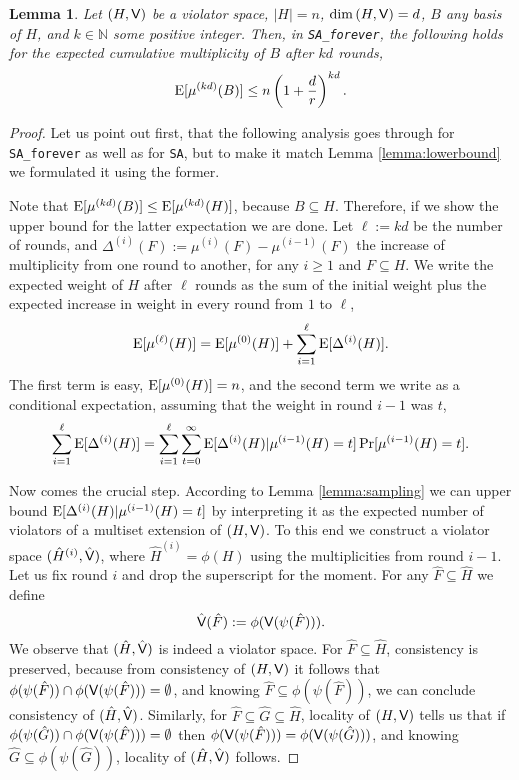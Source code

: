 \documentclass[12pt]{article}
\def\Exp{\qopname\relax m{E}}
\def\Violators{{\sf V}}
\newtheorem{lemma2}[theorem2]{Lemma}
\newenvironment{lemma}{\begin{lemma2}}{\end{lemma2}}
\theoremstyle{remark}
\def\stageII{\texttt{SA}}
\def\stageIIforever{\texttt{SA\_forever}}
\begin{document}
\begin{lemma}
\label{lemma:upperbound}
Let $(H,\Violators)$ be a violator space, $|H|=n$, $\dim{(H,\Violators)}=d$,
$B$ any basis of $H$, and $k \in \mathbb{N}$ some positive integer.
Then, in \stageIIforever, the following holds for the expected cumulative
multiplicity of $B$ after $kd$ rounds,
\[
	\Exp[\mu^{(kd)}(B)] \leq n\left(1+\frac{d}{r}\right)^{kd}.
\]
\end{lemma}
\begin{proof}

Let us point out first, that the following analysis goes through for
\stageIIforever{ }as well
as for \stageII, but to make it match Lemma \ref{lemma:lowerbound} we formulated it using
the former.

Note that $\Exp[\mu^{(kd)}(B)] \leq \Exp[\mu^{(kd)}(H)]$, because $B
\subseteq H$. Therefore, if we show the upper bound for the latter expectation we are done. Let  
$\ell:=k d$ be the number of rounds, and
$\Delta^{(i)}(F) := \mu^{(i)}(F) - \mu^{(i-1)}(F)$ the increase of multiplicity from one round to another, for any $i\geq1$ and
$F\subseteq H$.
We write the expected weight of $H$ after $\ell$ rounds as the sum of the initial 
weight plus the expected increase in weight in every round from $1$ to $\ell$,
\begin{equation}
\label{eq:d01}
	\Exp[\mu^{(\ell)}(H)]  =  \Exp[\mu^{(0)}(H)] + \sum_{i=1}^\ell \Exp[\Delta^{(i)}(H)].
\end{equation}
The first term is easy, $\Exp[\mu^{(0)}(H)]=n$, and the second term we write as a conditional 
expectation,
assuming that the weight in round $i-1$ was $t$,
\begin{equation}
\label{eq:d02}
	\sum_{i=1}^\ell \Exp[\Delta^{(i)}(H)] = \sum_{i=1}^{\ell} \sum_{t=0}^{\infty} 
	\Exp[\Delta^{(i)}(H)|\mu^{(i-1)}(H)=t]
	\Pr[\mu^{(i-1)}(H)=t].
\end{equation}

Now comes the crucial step. According to Lemma \ref{lemma:sampling} we can 
upper bound
$\Exp[\Delta^{(i)}(H)|\mu^{(i-1)}(H)=t]$
by interpreting it as the expected 
number of violators of a
multiset extension of $(H,\Violators)$.
To this end we construct a violator space
$(\hat{H}^{(i)},\hat{\Violators})$, where $\hat{H}^{(i)}= \phi(H)$
using the multiplicities from round $i-1$.
Let us fix round $i$ and drop the superscript for the moment. For any
$\hat{F}\subseteq \hat{H}$ we define
\[
	\hat{\Violators}(\hat{F}):= \phi(\Violators({\psi(\hat{F})})).
\]
We observe that $(\hat{H},\hat{\Violators})$ is indeed a violator space. For
$\hat{F}\subseteq \hat{H}$, consistency
is preserved, because from consistency of $(H,\Violators)$ it follows that 
$\phi(\psi(\hat{F}))\cap\phi(\Violators(\psi(\hat{F})))=\emptyset$, and knowing
$\hat{F}\subseteq\phi(\psi(\hat{F}))$, we can conclude consistency of $(\hat{H}, \hat{\Violators})$. 
Similarly,
for $\hat{F}\subseteq\hat{G}\subseteq\hat{H}$, locality of $(H,\Violators)$ tells us that if
$\phi(\psi(\hat{G}))\cap\phi(\Violators(\psi(\hat{F})))=\emptyset$ then
$\phi(\Violators(\psi(\hat{F})))=\phi(\Violators(\psi(\hat{G})))$, and knowing $\hat{G}\subseteq
\phi(\psi(\hat{G}))$,
locality of $(\hat{H},\hat{\Violators})$ follows.


\end{proof}
\end{document}

